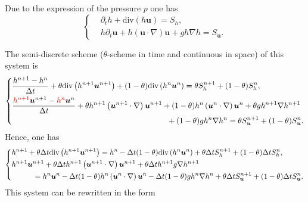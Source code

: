 \documentclass[a4paper, 11pt]{article}
\begin{document}
Due to the expression of the pressure $p$ one has 
\begin{equation*}
\left\{\begin{split}
&\partial_t h+\text{div}\left(h\boldsymbol{u}\right)=S_h,\\
&h\partial_t \boldsymbol{u}+h\left(\boldsymbol{u}\cdot \nabla\right)\boldsymbol{u}+gh\nabla h=S_{\boldsymbol{u}}.
\end{split}\right.
\end{equation*}

The semi-discrete scheme ($\theta$-scheme in time and continuous in space) of this system is
\begin{equation*}
\left\{\begin{split}
&\frac{h^{n+1}-h^n}{\Delta t}+\theta\text{div}\left(h^{n+1}\boldsymbol{u}^{n+1}\right)+(1-\theta)\text{div}\left(h^{n}\boldsymbol{u}^{n}\right)=\theta S_h^{n+1}+(1-\theta)S_h^n,\\
&\frac{\textcolor{red}{h^{n+1}}\boldsymbol{u}^{n+1}-\textcolor{red}{h^n}\boldsymbol{u}^{n}}{\Delta t}+\theta h^{n+1}\left(\boldsymbol{u}^{n+1}\cdot \nabla\right)\boldsymbol{u}^{n+1}+(1-\theta) h^{n}\left(\boldsymbol{u}^{n}\cdot \nabla\right)\boldsymbol{u}^{n}+\theta gh^{n+1}\nabla h^{n+1}\\
&\hspace*{7cm}+(1-\theta)gh^n\nabla h^n=\theta S_{\boldsymbol{u}}^{n+1}+(1-\theta)S_{\boldsymbol{u}}^n.
\end{split}\right.
\end{equation*}
Hence, one has
\begin{equation*}
\left\{
\begin{split}
&h^{n+1}+\theta\Delta t\text{div}\left(h^{n+1}\boldsymbol{u}^{n+1}\right)=h^n-\Delta t(1-\theta)\text{div}\left(h^n\boldsymbol{u}^n\right)+\theta \Delta tS_h^{n+1}+(1-\theta)\Delta tS_h^n,\\
&h^{n+1}\boldsymbol{u}^{n+1}+\theta\Delta th^{n+1}\left(\boldsymbol{u}^{n+1}\cdot\nabla\right)\boldsymbol{u}^{n+1}+\theta\Delta th^{n+1}g\nabla h^{n+1}\\
&\hspace*{1cm}=h^n\boldsymbol{u}^n-\Delta t(1-\theta)h^n\left(\boldsymbol{u}^n\cdot \nabla\right)\boldsymbol{u}^n-\Delta t(1-\theta)gh^n\nabla h^n+\theta \Delta tS_{\boldsymbol{u}}^{n+1}+(1-\theta)\Delta tS_{\boldsymbol{u}}^n.
\end{split}
\right.
\end{equation*}
This system can be rewritten in the form
\end{document}
